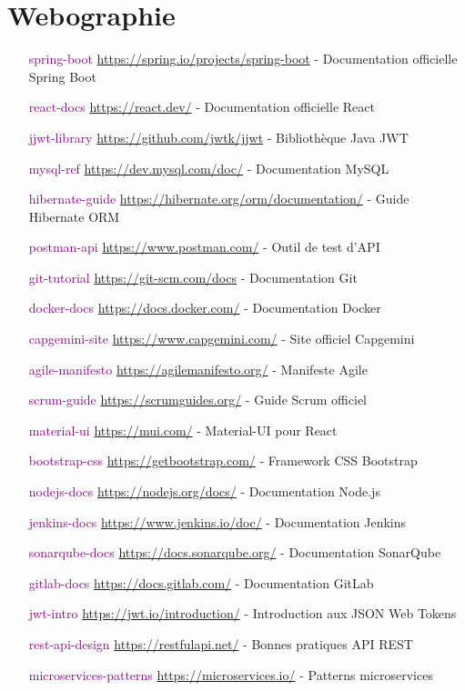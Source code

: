 \documentclass[12pt,a4paper]{report}
\begin{document}

\cleardoublepage
\chapter*{Webographie}

\begin{itemize}
\item[\textcolor{purple}{spring-boot}] \url{https://spring.io/projects/spring-boot} - Documentation officielle Spring Boot
\item[\textcolor{purple}{react-docs}] \url{https://react.dev/} - Documentation officielle React
\item[\textcolor{purple}{jjwt-library}] \url{https://github.com/jwtk/jjwt} - Bibliothèque Java JWT
\item[\textcolor{purple}{mysql-ref}] \url{https://dev.mysql.com/doc/} - Documentation MySQL
\item[\textcolor{purple}{hibernate-guide}] \url{https://hibernate.org/orm/documentation/} - Guide Hibernate ORM
\item[\textcolor{purple}{postman-api}] \url{https://www.postman.com/} - Outil de test d'API
\item[\textcolor{purple}{git-tutorial}] \url{https://git-scm.com/docs} - Documentation Git
\item[\textcolor{purple}{docker-docs}] \url{https://docs.docker.com/} - Documentation Docker
\item[\textcolor{purple}{capgemini-site}] \url{https://www.capgemini.com/} - Site officiel Capgemini
\item[\textcolor{purple}{agile-manifesto}] \url{https://agilemanifesto.org/} - Manifeste Agile
\item[\textcolor{purple}{scrum-guide}] \url{https://scrumguides.org/} - Guide Scrum officiel
\item[\textcolor{purple}{material-ui}] \url{https://mui.com/} - Material-UI pour React
\item[\textcolor{purple}{bootstrap-css}] \url{https://getbootstrap.com/} - Framework CSS Bootstrap
\item[\textcolor{purple}{nodejs-docs}] \url{https://nodejs.org/docs/} - Documentation Node.js
\item[\textcolor{purple}{jenkins-docs}] \url{https://www.jenkins.io/doc/} - Documentation Jenkins
\item[\textcolor{purple}{sonarqube-docs}] \url{https://docs.sonarqube.org/} - Documentation SonarQube
\item[\textcolor{purple}{gitlab-docs}] \url{https://docs.gitlab.com/} - Documentation GitLab
\item[\textcolor{purple}{jwt-intro}] \url{https://jwt.io/introduction/} - Introduction aux JSON Web Tokens
\item[\textcolor{purple}{rest-api-design}] \url{https://restfulapi.net/} - Bonnes pratiques API REST
\item[\textcolor{purple}{microservices-patterns}] \url{https://microservices.io/} - Patterns microservices
\end{itemize}
\end{document}
